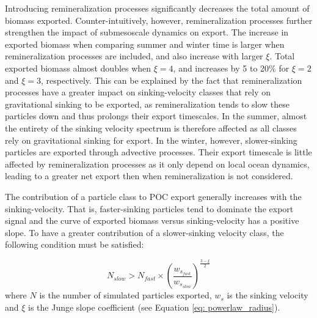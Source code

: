 \documentclass[draft,linenumbers]{agujournal2018}
\begin{document}
Introducing remineralization processes significantly decreases the total amount of biomass exported. Counter-intuitively, however, remineralization processes further strengthen the impact of submesoscale dynamics on export. The increase in exported biomass when comparing summer and winter time is larger when remineralization processes are included, and also increase with larger $\xi$. Total exported biomass almost doubles when $\xi =4$, and increases by 5 to 20\% for $\xi =2$ and $\xi = 3$, respectively. This can be explained by the fact that remineralization processes have a greater impact on sinking-velocity classes that rely on gravitational sinking to be exported, as remineralization tends to slow these particles down and thus prolongs their export timescales. In the summer, almost the entirety of the sinking velocity spectrum is therefore affected as all classes rely on gravitational sinking for export. In the winter, however, slower-sinking particles are exported through advective processes. Their export timescale is little affected by remineralization processes as it only depend on local ocean dynamics, leading to a greater net export then when remineralization is not considered.

The contribution of a particle class to POC export generally increases with the sinking-velocity. That is, faster-sinking particles tend to dominate the export signal and the curve of exported biomass versus sinking-velocity has a positive slope. To have a greater contribution of a slower-sinking velocity class, the following condition must be satisfied:

\begin{equation}
    N_{slow} > N_{fast} \times \left(\frac{w_{s_{fast}}}{w_{s_{slow}}}\right)^{\frac{3 - \xi}{2}}
    \label{eq: condition}
\end{equation}
where $N$ is the number of simulated particles exported, $w_s$ is the sinking velocity and $\xi$ is the Junge slope coefficient (see Equation \ref{eq: powerlaw_radius}).
\end{document}
